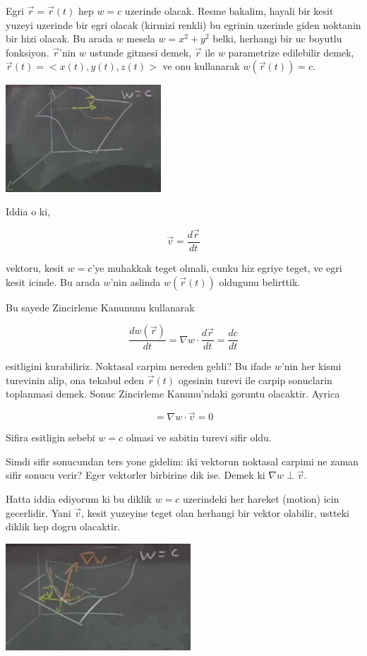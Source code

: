 \documentclass[12pt,fleqn]{article}
\begin{document}
Egri $\vec{r} = \vec{r}(t)$ hep $w = c$ uzerinde olacak. Resme bakalim,
hayali bir kesit yuzeyi uzerinde bir egri olacak (kirmizi renkli) bu
egrinin uzerinde giden noktanin bir hizi olacak. Bu arada $w$ 
mesela $w = x^2
+ y^2$ belki, herhangi bir uc boyutlu fonksiyon. $\vec{r}$'nin $w$ ustunde
gitmesi demek, $\vec{r}$ ile $w$ parametrize edilebilir demek,
 $\vec{r}(t)
= <x(t),y(t),z(t)>$ ve onu kullanarak  $w(\vec{r}(t)) = c$. 

\includegraphics[height=4cm]{12_3.png}

Iddia o ki, 

\[ \vec{v} = \frac{d\vec{r}}{dt} \]

vektoru, kesit $w = c$'ye muhakkak teget olmali, cunku hiz egriye teget, ve
egri kesit icinde. Bu arada $w$'nin aslinda $w(\vec{r}(t))$ oldugunu
belirttik.

Bu sayede Zincirleme Kanununu kullanarak 

\[ \frac{dw(\vec{r})}{dt} = \nabla w \cdot \frac{d\vec{r}}{dt} = \frac{dc}{dt}\]

esitligini kurabiliriz. Noktasal carpim nereden geldi? Bu ifade $w$'nin
her kismi turevinin alip, ona tekabul eden $\vec{r}(t)$ ogesinin turevi ile
carpip sonuclarin toplanmasi demek. Sonuc Zincirleme Kanunu'ndaki goruntu
olacaktir. Ayrica

\[  = \nabla w \cdot \vec{v} = 0\]

Sifira esitligin sebebi $w = c$ olmasi ve sabitin turevi sifir oldu. 

Simdi sifir sonucundan ters yone gidelim: iki vektorun noktasal carpimi ne
zaman sifir sonucu verir? Eger vektorler birbirine dik ise. Demek ki
$\nabla w \perp \vec{v}$.

Hatta iddia ediyorum ki bu diklik $w=c$ uzerindeki her hareket (motion)
icin gecerlidir. Yani $\vec{v}$, kesit yuzeyine teget olan herhangi bir
vektor olabilir, ustteki diklik hep dogru olacaktir.

\includegraphics[height=4cm]{12_4.png}
\end{document}
